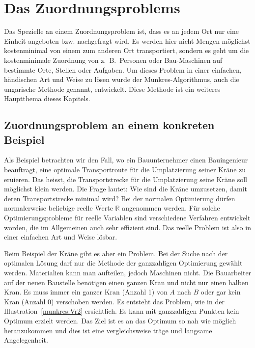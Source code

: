 %
%
%
\section{Das Zuordnungsproblems
\label{munkres:section:teil1}}

Das Spezielle an einem Zuordnungsproblem ist, dass es an jedem Ort nur eine Einheit angeboten bzw. nachgefragt wird. Es werden hier nicht Mengen möglichst kostenminimal von einem zum anderen
Ort transportiert, sondern es geht um die kostenminimale Zuordnung von z.~B.~Personen oder Bau-Maschinen auf bestimmte Orte, Stellen oder Aufgaben.
Um dieses Problem in einer einfachen, händischen Art und Weise zu lösen wurde der Munkres-Algorithmus, auch die ungarische Methode genannt, entwickelt. Diese Methode ist ein weiteres Hauptthema dieses Kapitels.
%
%

\subsection{Zuordnungsproblem an einem konkreten Beispiel
\label{munkres:subsection:bonorum}}
Als Beispiel betrachten wir den Fall, wo ein Bauunternehmer einen Bauingenieur beauftragt, eine optimale Transportroute für die Umplatzierung seiner Kräne zu eruieren. Das heisst, die Transportstrecke für die Umplatzierung seine Kräne
soll möglichst klein werden. 
Die Frage lautet: Wie sind die Kräne umzusetzen, damit deren Transportstrecke minimal wird? Bei der normalen Optimierung dürfen normalerweise beliebige reelle Werte $\mathbb{R}$ angenommen werden. 
%
%
%
Für solche Optimierungsprobleme für reelle Variablen sind verschiedene Verfahren entwickelt worden, die im Allgemeinen auch sehr effizient sind. Das reelle Problem ist also in einer einfachen Art und Weise lösbar.

Beim Beispiel der Kräne gibt es aber ein Problem. Bei der Suche nach der optimalen Lösung darf  nur die Methode der ganzzahligen Optimierung gewählt werden. Materialien kann man aufteilen, jedoch Maschinen nicht. Die Bauarbeiter auf der neuen Baustelle benötigen einen ganzen Kran und nicht nur einen halben Kran. Es muss immer ein ganzer Kran (Anzahl 1) von $A$ nach $B$ oder gar kein Kran (Anzahl 0) verschoben werden. 
%
%
Es entsteht das Problem, wie in der Illustration~\ref{munkres:Vr2} ersichtlich. Es kann mit ganzzahligen Punkten kein Optimum erzielt werden. Das Ziel ist es an das Optimum so nah wie möglich heranzukommen und dies ist eine vergleichsweise träge und langsame Angelegenheit.

